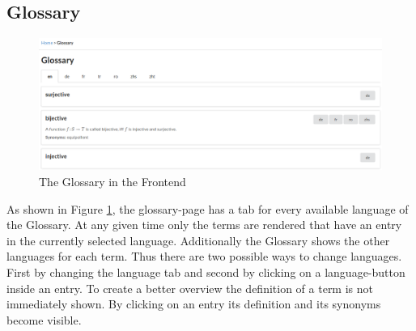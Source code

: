 \documentclass[11pt,a4paper]{article}
\begin{document}
\subsection{Glossary} \label{gloss}
\begin{figure}[H]
\includegraphics[width=1\textwidth]{glossary.png}
\caption{The Glossary in the Frontend}
\label{fig:glossary}
\end{figure}
As shown in Figure \ref{fig:glossary}, the glossary-page has a tab for every available language of the Glossary.
At any given time only the terms are rendered that have an entry in the currently selected language.
Additionally the Glossary shows the other languages for each term.
Thus there are two possible ways to change languages.
First by changing the language tab and second by clicking on a language-button inside an entry.
\newline \newline
To create a better overview the definition of a term is not immediately shown.
By clicking on an entry its definition and its synonyms become visible.
\end{document}
